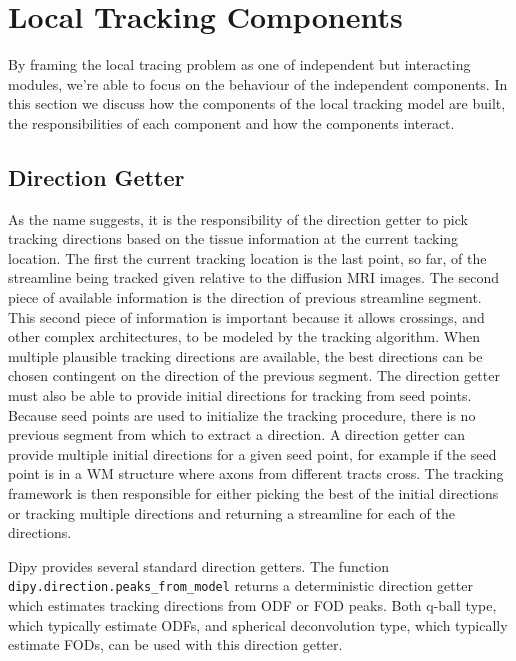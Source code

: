 \section{Local Tracking Components}
    By framing the local tracing problem as one of independent but interacting modules, we're able to focus on the behaviour of the independent components. In this section we discuss how the components of the local tracking model are built, the responsibilities of each component and how the components interact.

\subsection{Direction Getter}
    As the name suggests, it is the responsibility of the direction getter to pick tracking directions based on the tissue information at the current tacking location. The first the current tracking location is the last point, so far, of the streamline being tracked given relative to the diffusion MRI images. The second piece of available information is the direction of previous streamline segment. This second piece of information is important because it allows crossings, and other complex architectures, to be modeled by the tracking algorithm. When multiple plausible tracking directions are available, the best directions can be chosen contingent on the direction of the previous segment. The direction getter must also be able to provide initial directions for tracking from seed points. Because seed points are used to initialize the tracking procedure, there is no previous segment from which to extract a direction. A direction getter can provide multiple initial directions for a given seed point, for example if the seed point is in a WM structure where axons from different tracts cross. The tracking framework is then responsible for either picking the best of the initial directions or tracking multiple directions and returning a streamline for each of the directions.
    
    Dipy provides several standard direction getters. The function \verb|dipy.direction.peaks_from_model| returns a deterministic direction getter which estimates tracking directions from ODF or FOD peaks. Both q-ball type, which typically estimate ODFs, and spherical deconvolution type, which typically estimate FODs, can be used with this direction getter. 
    
